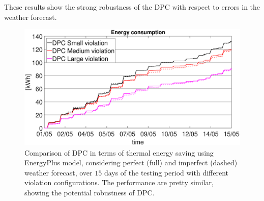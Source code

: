 \textcolor[rgb]{0,0,1}{These results show the strong robustness of the DPC with respect to errors in the weather forecast.}
\begin{figure}[t!]
	\begin{center}
		\includegraphics[width=28pc]{figures/Energy_all_EnergyPlus_noisy.eps}
	\end{center}
	\caption{\textcolor[rgb]{0,0,1}{Comparison of DPC in terms of thermal energy saving using EnergyPlus model, considering perfect (full) and imperfect (dashed) weather forecast, over $15$ days of the testing period with different violation configurations. The performance are pretty similar, showing the potential robustness of DPC.}}
	\label{F:comparison_all_energy_E+_noisy}
\end{figure}

